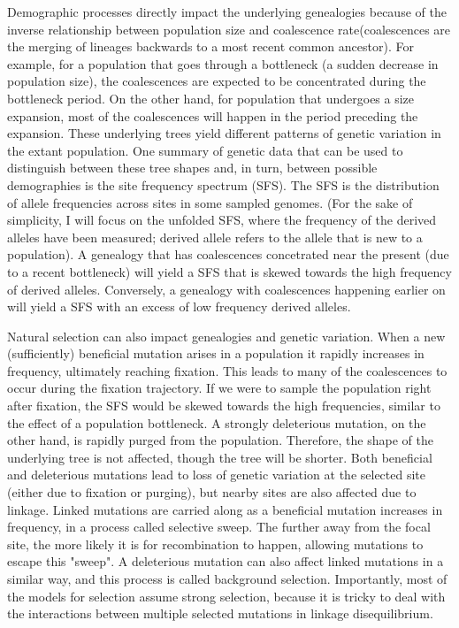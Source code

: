 Demographic processes directly impact the underlying genealogies because of the inverse relationship between population size and coalescence rate(coalescences are the merging of lineages backwards to a most recent common ancestor).
For example, for a population that goes through a bottleneck (\ie a sudden decrease in population size),
the coalescences are expected to be concentrated during the bottleneck period.
On the other hand, for population that undergoes a size expansion,
most of the coalescences will happen in the period preceding the expansion.
These underlying trees yield different patterns of genetic variation in the extant population.
One summary of genetic data that can be used to distinguish between these tree shapes and, in turn, between possible demographies is the site frequency spectrum (SFS).
The SFS is the distribution of allele frequencies across sites in some sampled genomes.
(For the sake of simplicity, I will focus on the unfolded SFS, where the frequency of the derived alleles have been measured; derived allele refers to the allele that is new to a population).
A genealogy that has coalescences concetrated near the present (due to a recent bottleneck) will yield a SFS that is skewed towards the high frequency of derived alleles.
Conversely, a genealogy with coalescences happening earlier on will yield a SFS with an excess of low frequency derived alleles.

Natural selection can also impact genealogies and genetic variation.
When a new (sufficiently) beneficial mutation arises in a population it rapidly increases in frequency, ultimately reaching fixation.
This leads to many of the coalescences to occur during the fixation trajectory.
If we were to sample the population right after fixation,
the SFS would be skewed towards the high frequencies, similar to the effect of a population bottleneck.
A strongly deleterious mutation, on the other hand, is rapidly purged from the population.
Therefore, the shape of the underlying tree is not affected, though the tree will be shorter.
Both beneficial and deleterious mutations lead to loss of genetic variation at the selected site (either due to fixation or purging),
but nearby sites are also affected due to linkage.
Linked mutations are carried along as a beneficial mutation increases in frequency, in a process called selective sweep.
The further away from the focal site, the more likely it is for recombination to happen, allowing mutations to escape this "sweep".
A deleterious mutation can also affect linked mutations in a similar way, and this process is called background selection.
Importantly, most of the models for selection assume strong selection,
because it is tricky to deal with the interactions between multiple selected mutations in linkage disequilibrium.

